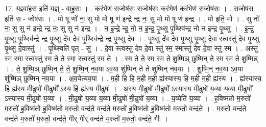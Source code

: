 \documentclass[17pt]{extarticle}
\begin{document}
17. य॒ज्ञ्वा॑हस॒ इति॑ य॒ज्ञ् - वा॒ह॒सः॒ । . क॒रं॒भेण॑ स॒जोष॑सः स॒जोष॑सः करं॒भेण॑ करं॒भेण॑ स॒जोष॑सः । . स॒जोष॑स॒ इति॑ स - जोष॑सः । . मो षू णो॑ नः॒ सु मो मो षू ण॑ इन्द्रे न्द्र नः॒ सु मो मो षू ण॑ इन्द्र । . मो इति॒ मो । . सु नो॑ नः॒ सु सु न॑ इन्द्रे न्द्र नः॒ सु सु न॑ इन्द्र । . न॒ इ॒न्द्रे॒ न्द्र॒ नो॒ न॒ इ॒न्द्र॒ पृ॒थ्सु पृ॒थ्स्वि॑न्द्र नो न इन्द्र पृ॒थ्सु । . इ॒न्द्र॒ पृ॒थ्सु पृ॒थ्स्वि॑न्द्रे न्द्र पृ॒थ्सु दे॑व देव पृ॒थ्स्वि॑न्द्रे न्द्र पृ॒थ्सु दे॑व । . पृ॒थ्सु दे॑व देव पृ॒थ्सु पृ॒थ्सु दे॒वा स्त्वस्तु॑ देव पृ॒थ्सु पृ॒थ्सु दे॒वास्तु॑ । . पृ॒थ्स्विति॑ पृत् - सु । . दे॒वा स्त्वस्तु॑ देव दे॒वा स्तु॑ स्म॒ स्मास्तु॑ देव दे॒वा स्तु॑ स्म । . अस्तु॑ स्म॒ स्मा स्त्वस्तु॑ स्म ते ते॒ स्मा स्त्वस्तु॑ स्म ते । . स्म॒ ते॒ ते॒ स्म॒ स्म॒ ते॒ शु॒ष्मि॒ञ् छु॒ष्मि॒न् ते॒ स्म॒ स्म॒ ते॒ शु॒ष्मि॒न्न् । . ते॒ शु॒ष्मि॒ञ् छु॒ष्मि॒न् ते॒ ते॒ शु॒ष्मि॒न् न॒व॒या ऽव॒या शु॑ष्मिन् ते ते शुष्मिन् नव॒या । . शु॒ष्मि॒न् न॒व॒या ऽव॒या शु॑ष्मिञ् छुष्मिन् नव॒या । . अ॒व॒येत्य॑व॒या । . म॒ही हि हि म॒ही म॒ही ह्य॑स्यास्य॒ हि म॒ही म॒ही ह्य॑स्य । . ह्य॑स्यास्य॒ हि ह्य॑स्य मी॒ढुषो॑ मी॒ढुषो᳚ ऽस्य॒ हि ह्य॑स्य मी॒ढुषः॑ । . अ॒स्य॒ मी॒ढुषो॑ मी॒ढुषो᳚ ऽस्यास्य मी॒ढुषो॑ य॒व्या य॒व्या मी॒ढुषो᳚ ऽस्यास्य मी॒ढुषो॑ य॒व्या । . मी॒ढुषो॑ य॒व्या य॒व्या मी॒ढुषो॑ मी॒ढुषो॑ य॒व्या । . य॒व्येति॑ य॒व्या । . ह॒विष्म॑तो म॒रुतो॑ म॒रुतो॑ ह॒विष्म॑तो ह॒विष्म॑तो म॒रुतो॒ वन्द॑ते॒ वन्द॑ते म॒रुतो॑ ह॒विष्म॑तो ह॒विष्म॑तो म॒रुतो॒ वन्द॑ते । . म॒रुतो॒ वन्द॑ते॒ वन्द॑ते म॒रुतो॑ म॒रुतो॒ वन्द॑ते॒ गीर् गीर् वन्द॑ते म॒रुतो॑ म॒रुतो॒ वन्द॑ते॒ गीः । \newline
\end{document}
